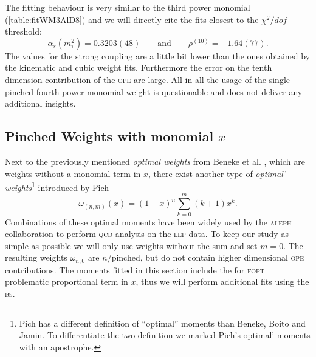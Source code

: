 \documentclass[../../index.tex]{subfiles}
\begin{document}
The fitting behaviour is very similar to the third power monomial
(\cref{table:fitWM3AlD8}) and we will directly cite the fits closest to the
\(\chi^2/dof\) threshold:
\begin{equation}
  \alpha_s(m_\tau^2) = 0.3203(48) \qquad \text{and} \qquad \rho^{(10)}=-1.64(77).
\end{equation}
The values for the strong coupling are a little bit lower than the ones obtained
by the kinematic and cubic weight fits. Furthermore the error on the tenth
dimension contribution of the \textsc{ope} are large. All in all the usage of
the single pinched fourth power monomial weight is questionable and does not
deliver any additional insights.


\subsection{Pinched Weights with monomial \(x\)}
Next to the previously mentioned \textit{optimal weights} from Beneke et al.
\cite{Beneke2012}, which are weights without a monomial term in \(x\), there
exist another type of \textit{optimal' weights}\footnote{Pich has a different
  definition of ``optimal'' moments than Beneke, Boito and Jamin. To
  differentiate the two definition we marked Pich's optimal' moments with an
  apostrophe.} introduced by Pich \cite{LeDiberder1992}
\begin{equation}
  \omega_{(n,m)}(x) = (1-x)^n\sum_{k=0}^m (k+1)x^k.
\end{equation}
Combinations of these optimal moments have been widely used by the
\textsc{aleph} collaboration to perform \textsc{qcd} analysis on the
\textsc{lep} data. To keep our study as simple as possible we will only use
weights without the sum and set \(m=0\). The resulting weights \(\omega_{n,0}\)
are \(n\)\-/pinched, but do not contain higher dimensional \textsc{ope}
contributions. The moments fitted in this section include the for \textsc{fopt}
problematic proportional term in \(x\), thus we will perform additional fits
using the \textsc{bs}.
\end{document}
